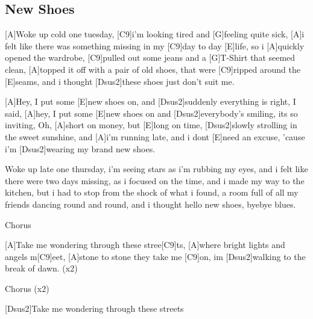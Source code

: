 \subsection*{New Shoes   }
\begin{guitar}
[A]Woke up cold one tuesday,
[C9]i'm looking tired and [G]feeling quite sick, 
[A]i felt like there was something missing in my [C9]day to day [E]life, 
so i [A]quickly opened the wardrobe, 
[C9]pulled out some jeans and a [G]T-Shirt that seemed clean, 
[A]topped it off with a pair of old shoes, 
that were [C9]ripped around the [E]seams,
and i thought [Dsus2]these shoes just don't suit me. 



[A]Hey, I put some [E]new shoes on, 
and [Dsus2]suddenly everything is right,
I said, [A]hey, I put some [E]new shoes on 
and [Dsus2]everybody's smiling, its so inviting, 
Oh, [A]short on money, but [E]long on time,
[Dsus2]slowly strolling in the sweet sunshine,
and [A]i'm running late,
and i dont [E]need an excuse,
'cause i'm [Dsus2]wearing my brand new shoes.
 
 
 
Woke up late one thursday,
i'm seeing stars as i'm rubbing my eyes, 
and i felt like there were two days missing, 
as i focused on the time,
and i made my way to the kitchen,
but i had to stop from the shock of what i found,
a room full of all my friends dancing round and round,
and i thought hello new shoes, byebye blues. 

 
 
Chorus  

 
 
[A]Take me wondering through these stree[C9]ts, 
[A]where bright lights and angels m[C9]eet, 
[A]stone to stone they take me [C9]on,  
im [Dsus2]walking to the break of dawn. (x2) 

 
 
Chorus (x2)
 
 
 
[Dsus2]Take me wondering through these streets 

\end{guitar}
